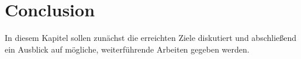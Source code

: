 \chapter{Conclusion}
In diesem Kapitel sollen zunächst die erreichten Ziele diskutiert und abschließend ein Ausblick auf mögliche, weiterführende Arbeiten gegeben werden.
